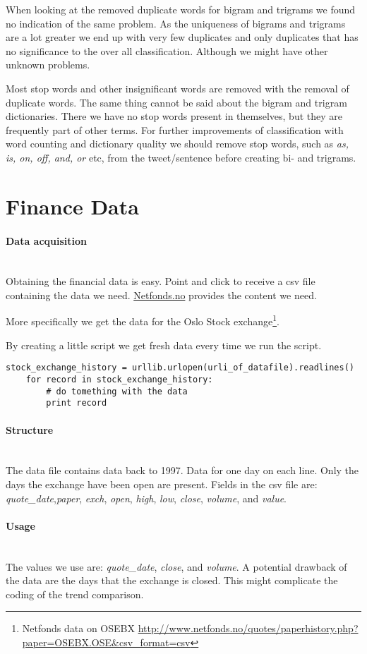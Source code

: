 When looking at the removed duplicate words for bigram and trigrams we found no
indication of the same problem. As the uniqueness of bigrams and trigrams are a
lot greater we end up with very few duplicates and only duplicates that has no
significance to the over all classification. Although we might have other
unknown problems.  

Most stop words and other insignificant words are removed with the removal of
duplicate words. The same thing cannot be said about the bigram and trigram
dictionaries. There we have no stop words present in themselves, but they are
frequently part of other terms. For further improvements of classification with
word counting and dictionary quality we should remove
stop words, such as \textit{as, is, on, off, and, or} etc, from the
tweet/sentence before creating bi- and trigrams.     
%

\section{Finance Data}\label{data:finance}

\paragraph{Data acquisition}
\hspace{0pt}\\
Obtaining the financial data is easy. Point and click to receive a csv file
containing the data we need. \url{Netfonds.no} provides the content we need.

More specifically we get the data for the Oslo Stock exchange\footnote{Netfonds
data on OSEBX
\url{http://www.netfonds.no/quotes/paperhistory.php?paper=OSEBX.OSE&csv_format=csv}}. 

By creating a little script we get fresh data every time we run the script.
\begin{verbatim}
stock_exchange_history = urllib.urlopen(urli_of_datafile).readlines()
    for record in stock_exchange_history:
        # do tomething with the data
        print record
\end{verbatim} 

\paragraph{Structure}
\hspace{0pt}\\
The data file contains data back to 1997. Data for one day on each line. Only
the days the exchange have been open are present.
Fields in the csv file are: \textit{quote\_date},\textit{paper},
\textit{exch}, \textit{open}, \textit{high}, \textit{low}, \textit{close},
\textit{volume}, and \textit{value}.

\paragraph{Usage}
\hspace{0pt}\\
The values we use are: \textit{quote\_date}, \textit{close}, and
\textit{volume}.
A potential drawback of the data are the days that the exchange is closed. This
might complicate the coding of the trend comparison.
%

